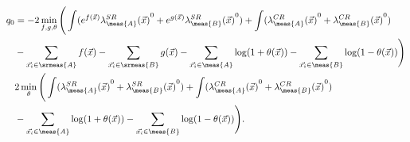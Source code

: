 \documentclass[../../ddppaper2.tex]{subfiles}
\begin{document}
\begin{equation*}
\begin{aligned}
    \invllratio &= - 2 \min\limits_{f, g, \nparam} \Bigg(
        \int (e^{f(\anyevent)}\srdist{\meas{A}}^0 + e^{g(\anyevent)}\srdist{\meas{B}}^0)
        + \int (\crdist{\meas{A}}^0 + \crdist{\meas{B}}^0)
        \\&
        - \sum\limits_{\event \in \srmeas{A}} f(\anyevent)
        - \sum\limits_{\event \in \srmeas{B}} g(\anyevent)
        - \sum\limits_{\event \in \meas{A}} \log(1 + {\nparam(\anyevent)})
        - \sum\limits_{\event \in \meas{B}} \log(1 - {\nparam(\anyevent)})
    \Bigg)
    \\&
    2 \min\limits_{\nparam} \Bigg(
        \int (\srdist{\meas{A}}^0 + \srdist{\meas{B}}^0)
        + \int (\crdist{\meas{A}}^0 + \crdist{\meas{B}}^0)
        \\&
        - \sum\limits_{\event \in \meas{A}} \log(1 + {\nparam(\anyevent)})
        - \sum\limits_{\event \in \meas{B}} \log(1 - {\nparam(\anyevent)})
    \Bigg).
\end{aligned}
\end{equation*}
\end{document}
